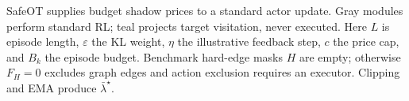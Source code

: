 SafeOT supplies budget shadow prices to a standard actor update. Gray modules perform standard RL; teal projects target visitation, never executed. Here $L$ is episode length, $\varepsilon$ the KL weight, $\eta$ the illustrative feedback step, $c$ the price cap, and $B_k$ the episode budget. Benchmark hard-edge masks $H$ are empty; otherwise $F_H=0$ excludes graph edges and action exclusion requires an executor. Clipping and EMA produce $\bar\lambda^\star$.
